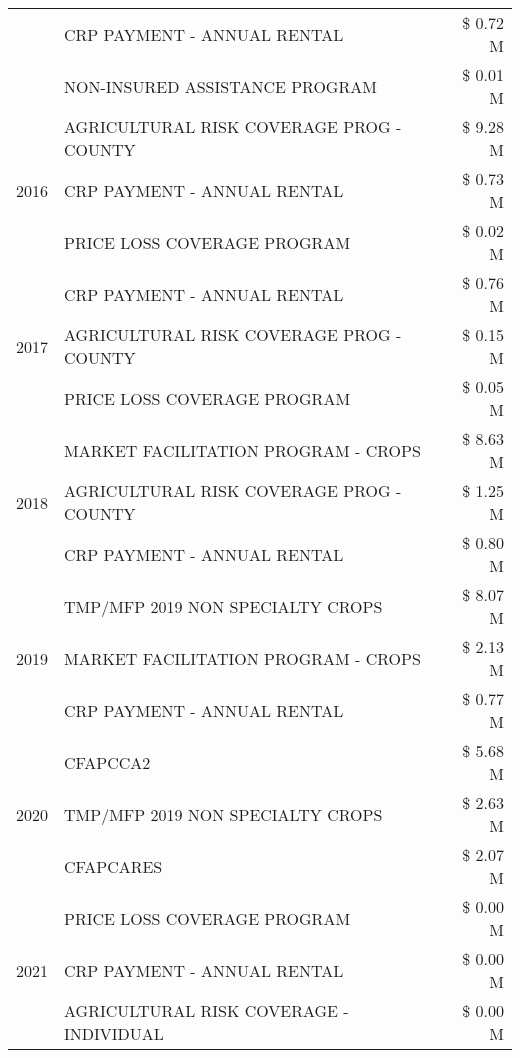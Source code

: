 \begin{tabular}{llr}
 & CRP PAYMENT - ANNUAL RENTAL & \$ 0.72 M \\
 & NON-INSURED ASSISTANCE PROGRAM & \$ 0.01 M \\
\cline{1-3}
\multirow[t]{3}{*}{2016} & AGRICULTURAL RISK COVERAGE PROG - COUNTY      & \$ 9.28 M \\
 & CRP PAYMENT - ANNUAL RENTAL                   & \$ 0.73 M \\
 & PRICE LOSS COVERAGE PROGRAM                   & \$ 0.02 M \\
\cline{1-3}
\multirow[t]{3}{*}{2017} & CRP PAYMENT - ANNUAL RENTAL & \$ 0.76 M \\
 & AGRICULTURAL RISK COVERAGE PROG - COUNTY & \$ 0.15 M \\
 & PRICE LOSS COVERAGE PROGRAM & \$ 0.05 M \\
\cline{1-3}
\multirow[t]{3}{*}{2018} & MARKET FACILITATION PROGRAM - CROPS & \$ 8.63 M \\
 & AGRICULTURAL RISK COVERAGE PROG - COUNTY & \$ 1.25 M \\
 & CRP PAYMENT - ANNUAL RENTAL & \$ 0.80 M \\
\cline{1-3}
\multirow[t]{3}{*}{2019} & TMP/MFP 2019 NON SPECIALTY CROPS & \$ 8.07 M \\
 & MARKET FACILITATION PROGRAM - CROPS & \$ 2.13 M \\
 & CRP PAYMENT - ANNUAL RENTAL & \$ 0.77 M \\
\cline{1-3}
\multirow[t]{3}{*}{2020} & CFAPCCA2 & \$ 5.68 M \\
 & TMP/MFP 2019 NON SPECIALTY CROPS & \$ 2.63 M \\
 & CFAPCARES & \$ 2.07 M \\
\cline{1-3}
\multirow[t]{3}{*}{2021} & PRICE LOSS COVERAGE PROGRAM & \$ 0.00 M \\
 & CRP PAYMENT - ANNUAL RENTAL & \$ 0.00 M \\
 & AGRICULTURAL RISK COVERAGE - INDIVIDUAL & \$ 0.00 M \\
\cline{1-3}
\bottomrule
\end{tabular}
